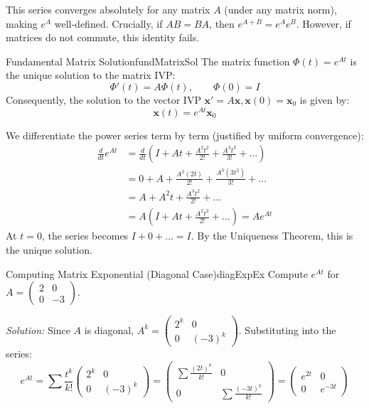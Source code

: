 \documentclass{book}
\newenvironment{Proof}[1][]
  {\begin{ProofTcb}[#1]}
  {\end{ProofTcb}}
\begin{document}
This series converges absolutely for any matrix $A$ (under any matrix norm), making $e^A$ well-defined. Crucially, if $AB = BA$, then $e^{A+B} = e^A e^B$. However, if matrices do not commute, this identity fails.

\begin{thm}{Fundamental Matrix Solution}{fundMatrixSol}
    The matrix function $\Phi(t) = e^{At}$ is the unique solution to the matrix IVP:
    \[
        \Phi'(t) = A\Phi(t), \qquad \Phi(0) = I
    \]
    Consequently, the solution to the vector IVP $\mathbf{x}' = A\mathbf{x}, \mathbf{x}(0) = \mathbf{x}_0$ is given by:
    \[
        \mathbf{x}(t) = e^{At}\mathbf{x}_0
    \]
\end{thm}

\begin{Proof}
    We differentiate the power series term by term (justified by uniform convergence):
    \begin{align*}
        \frac{d}{dt} e^{At} &= \frac{d}{dt} \left( I + At + \frac{A^2 t^2}{2!} + \frac{A^3 t^3}{3!} + \dots \right) \\
        &= 0 + A + \frac{A^2 (2t)}{2!} + \frac{A^3 (3t^2)}{3!} + \dots \\
        &= A + A^2 t + \frac{A^3 t^2}{2!} + \dots \\
        &= A \left( I + At + \frac{A^2 t^2}{2!} + \dots \right) = A e^{At}
    \end{align*}
    At $t=0$, the series becomes $I + 0 + \dots = I$. By the Uniqueness Theorem, this is the unique solution.
\end{Proof}

\begin{example}{Computing Matrix Exponential (Diagonal Case)}{diagExpEx}
    Compute $e^{At}$ for $A = \begin{pmatrix} 2 & 0 \\ 0 & -3 \end{pmatrix}$.

    \emph{Solution:}
    Since $A$ is diagonal, $A^k = \begin{pmatrix} 2^k & 0 \\ 0 & (-3)^k \end{pmatrix}$.
    Substituting into the series:
    \[
        e^{At} = \sum \frac{t^k}{k!} \begin{pmatrix} 2^k & 0 \\ 0 & (-3)^k \end{pmatrix} = \begin{pmatrix} \sum \frac{(2t)^k}{k!} & 0 \\ 0 & \sum \frac{(-3t)^k}{k!} \end{pmatrix} = \begin{pmatrix} e^{2t} & 0 \\ 0 & e^{-3t} \end{pmatrix}
    \]
\end{example}
\end{document}
